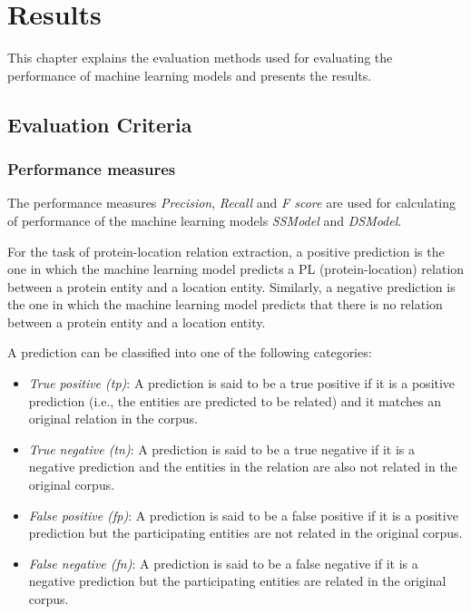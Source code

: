 \chapter{Results}\label{chapter:results}

This chapter explains the evaluation methods used for evaluating the performance of machine learning models and presents the results.

\section{Evaluation Criteria} \label{sec:evaluationCriteria}

\subsection{Performance measures}
The performance measures \textit{Precision}, \textit{Recall} and \textit{F score} are used for calculating of performance of the machine learning models \textit{SSModel} and \textit{DSModel}.

For the task of protein-location relation extraction, a positive prediction is the one in which the machine learning model predicts a PL (protein-location) relation between a protein entity and a location entity. Similarly, a negative prediction is the one in which the machine learning model predicts that there is no relation between a protein entity and a location entity. 

A prediction can be classified into one of the following categories:


\begin{itemize}

\item \textit{True positive (tp)}: A prediction is said to be a true positive if it is a positive prediction (i.e., the entities are predicted to be related) and it matches an original relation in the corpus.

\item \textit{True negative (tn)}: A prediction is said to be a true negative if it is a negative prediction and the entities in the relation are also not related in the original corpus.

\item \textit{False positive (fp)}: A prediction is said to be a false positive if it is a positive prediction but the participating entities are not related in the original corpus.

\item \textit{False negative (fn)}: A prediction is said to be a false negative if it is a negative prediction but the participating entities are related in the original corpus.

\end{itemize}

